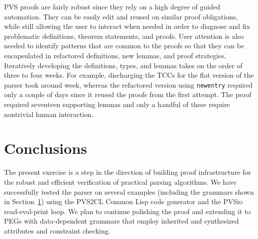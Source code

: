 \documentclass[sigplan,10pt,anonymous,review]{acmart}\settopmatter{printfolios=true,printccs=false,printacmref=false}
\begin{document}
\begin{CCSXML}
PVS proofs are fairly
robust since they rely on a high degree of guided automation. They 
can be  easily edit and reused on similar proof obligations, while
still allowing the user to interact when needed in order to 
diagnose and fix problematic definitions, theorem statements, and
proofs.  User attention is also needed to identify patterns that are
common to the proofs so that they can be encapsulated in refactored
definitions, new lemmas, and proof strategies.  
Iteratively developing the definitions, types, and lemmas takes on the
order of three to four weeks.  For example, discharging the TCCs for the
flat version of the parser took around  week, whereas the refactored
version using \texttt{newentry} required only a couple of days since it reused
the proofs from the first attempt.  The proof required seventeen supporting
lemmas and only a handful of these require nontrivial human interaction.  



\section{Conclusions}

The present exercise is a step in the direction of building proof
infrastructure for the robust and efficient verification of practical
parsing algorithms.  We have successfully tested the parser on
several examples (including the grammars shown in Section~\ref{}) using the
PVS2CL Common Lisp code generator and the PVSio read-eval-print loop.
We plan to continue polishing the proof and extending it to PEGs with
data-dependent grammars that employ inherited and synthesized
attributes and constraint checking.


\end{CCSXML}
\end{document}
